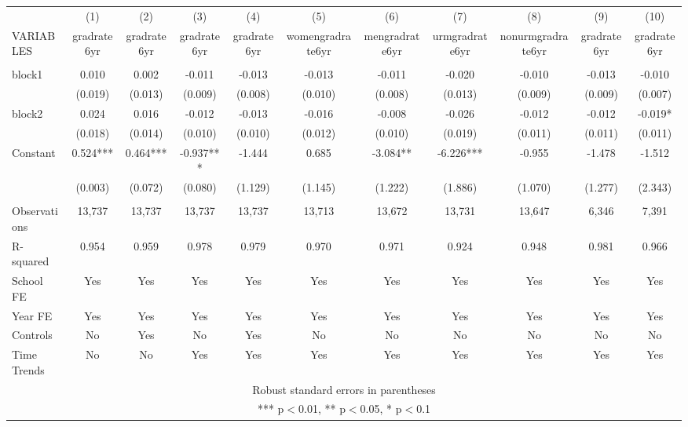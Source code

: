 \documentclass[]{article}
\begin{document}
\begin{tabular}{lcccccccccc} \hline
 & (1) & (2) & (3) & (4) & (5) & (6) & (7) & (8) & (9) & (10) \\
VARIABLES & gradrate6yr & gradrate6yr & gradrate6yr & gradrate6yr & womengradrate6yr & mengradrate6yr & urmgradrate6yr & nonurmgradrate6yr & gradrate6yr & gradrate6yr \\ \hline
 &  &  &  &  &  &  &  &  &  &  \\
block1 & 0.010 & 0.002 & -0.011 & -0.013 & -0.013 & -0.011 & -0.020 & -0.010 & -0.013 & -0.010 \\
 & (0.019) & (0.013) & (0.009) & (0.008) & (0.010) & (0.008) & (0.013) & (0.009) & (0.009) & (0.007) \\
block2 & 0.024 & 0.016 & -0.012 & -0.013 & -0.016 & -0.008 & -0.026 & -0.012 & -0.012 & -0.019* \\
 & (0.018) & (0.014) & (0.010) & (0.010) & (0.012) & (0.010) & (0.019) & (0.011) & (0.011) & (0.011) \\
Constant & 0.524*** & 0.464*** & -0.937*** & -1.444 & 0.685 & -3.084** & -6.226*** & -0.955 & -1.478 & -1.512 \\
 & (0.003) & (0.072) & (0.080) & (1.129) & (1.145) & (1.222) & (1.886) & (1.070) & (1.277) & (2.343) \\
 &  &  &  &  &  &  &  &  &  &  \\
Observations & 13,737 & 13,737 & 13,737 & 13,737 & 13,713 & 13,672 & 13,731 & 13,647 & 6,346 & 7,391 \\
R-squared & 0.954 & 0.959 & 0.978 & 0.979 & 0.970 & 0.971 & 0.924 & 0.948 & 0.981 & 0.966 \\
School FE & Yes & Yes & Yes & Yes & Yes & Yes & Yes & Yes & Yes & Yes \\
Year FE & Yes & Yes & Yes & Yes & Yes & Yes & Yes & Yes & Yes & Yes \\
Controls & No & Yes & No & Yes & No & No & No & No & No & No \\
 Time Trends & No & No & Yes & Yes & Yes & Yes & Yes & Yes & Yes & Yes \\ \hline
\multicolumn{11}{c}{ Robust standard errors in parentheses} \\
\multicolumn{11}{c}{ *** p$<$0.01, ** p$<$0.05, * p$<$0.1} \\
\end{tabular}
\end{document}
